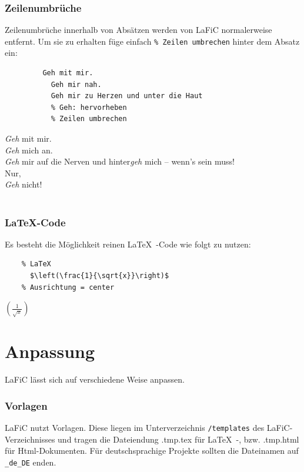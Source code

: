 \documentclass{scrartcl}
\begin{document}
\section{Zeilenumbrüche}

{Zeilenumbrüche  innerhalb von Absätzen werden von LaFiC normalerweise entfernt. Um sie zu erhalten füge einfach \texttt{\% Zeilen umbrechen} hinter dem Absatz ein:\\}

\begin{verbatim}
  	     Geh mit mir.
	       Geh mir nah.
	       Geh mir zu Herzen und unter die Haut
	       % Geh: hervorheben
	       % Zeilen umbrechen
\end{verbatim}


{\emph{Geh} mit mir.\\
\emph{Geh} mich an.\\
\emph{Geh} mir auf die Nerven und hinter\emph{geh} mich – wenn's sein muss!\\
Nur,\\
\emph{Geh} nicht!\\\\}

\section{LaTeX-Code}

{Es besteht die Möglichkeit reinen \LaTeX\ -Code wie folgt zu
nutzen:\\}

\begin{verbatim}
	% LaTeX
  	  $\left(\frac{1}{\sqrt{x}}\right)$  
	% Ausrichtung = center
\end{verbatim}


\centering%
  $\left(\frac{1}{\sqrt{x}}\right)$
\part{Anpassung}

{LaFiC lässt sich auf verschiedene Weise anpassen.\\}

\section{Vorlagen}

{LaFiC nutzt Vorlagen. Diese liegen im Unterverzeichnis
\texttt{/templates} des LaFiC-Verzeichnisses und tragen die
Dateiendung .tmp.tex für \LaTeX\ -, bzw. .tmp.html für
Html-Dokumenten. Für deutschsprachige Projekte sollten die
Dateinamen auf \texttt{\_de\_DE} enden.\\}
\end{document}
